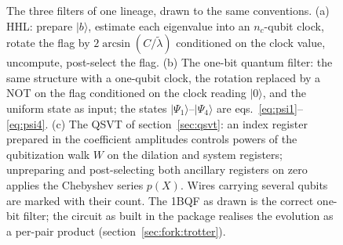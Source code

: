 \documentclass[11pt,a4paper]{article}
\begin{document}
\begin{figure}[H]
\centering
\captionsetup{width=0.96\textwidth}
\resizebox{0.98\textwidth}{!}{}
\caption{The three filters of one lineage, drawn to the same conventions.
(a) HHL: prepare $|b\rangle$, estimate each eigenvalue into an $n_c$-qubit
clock, rotate the flag by $2\arcsin(C/\tilde\lambda)$ conditioned on the clock
value, uncompute, post-select the flag. (b) The one-bit quantum filter: the
same structure with a one-qubit clock, the rotation replaced by a NOT on the
flag conditioned on the clock reading $|0\rangle$, and the uniform state as
input; the states $|\Psi_1\rangle$--$|\Psi_4\rangle$ are
eqs.~\eqref{eq:psi1}--\eqref{eq:psi4}. (c) The QSVT of section~\ref{sec:qsvt}:
an index register prepared in the coefficient amplitudes controls powers of
the qubitization walk $W$ on the dilation and system registers; unpreparing
and post-selecting both ancillary registers on zero applies the Chebyshev
series $p(X)$. Wires carrying several qubits are marked with their count. The
1BQF as drawn is the correct one-bit filter; the circuit as built in the
package realises the evolution as a per-pair product (section~\ref{sec:fork:trotter}).}
\label{fig:circuits}
\end{figure}
\end{document}
